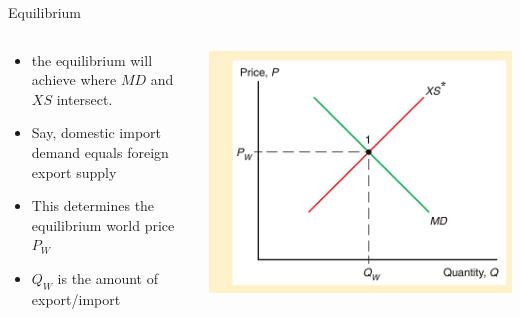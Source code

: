 \documentclass[10pt,hyperref={CJKbookmarks=true},xcolor=dvipsnames,aspectratio=169]{beamer}
\begin{document}
\begin{frame}{Equilibrium}


\begin{columns}[onlytextwidth]
\begin{column}{0.5\textwidth}
\begin{itemize}
\item the equilibrium will achieve where $MD$ and $XS$ intersect.  
\item Say, domestic import demand equals foreign export supply 
\item This determines the equilibrium world price $P_{W}$
\item $Q_W$ is the amount of export/import
\end{itemize}

\end{column}
\begin{column}{0.5\textwidth}
\includegraphics[width=\columnwidth]{fig/instruments/lec07-6}
\end{column}
\end{columns}

\end{frame}
\end{document}
